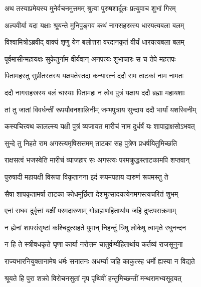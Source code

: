 
\twolineshloka
{अथ तस्याप्रमेयस्य मुनेर्वचनमुत्तमम्}
{श्रुत्वा पुरुषशार्दूलः प्रत्युवाच शुभां गिरम्} %

\twolineshloka
{अल्पवीर्या यदा यक्षाः श्रूयन्ते मुनिपुङ्गव}
{कथं नागसहस्रस्य धारयत्यबला बलम्} %

\twolineshloka
{विश्वामित्रोऽब्रवीद् वाक्यं शृणु येन बलोत्तरा}
{वरदानकृतं वीर्यं धारयत्यबला बलम्} %

\twolineshloka
{पूर्वमासीन्महायक्षः सुकेतुर्नाम वीर्यवान्}
{अनपत्यः शुभाचारः स च तेपे महत्तपः} %

\twolineshloka
{पितामहस्तु सुप्रीतस्तस्य यक्षपतेस्तदा}
{कन्यारत्नं ददौ राम ताटकां नाम नामतः} %

\twolineshloka
{ददौ नागसहस्रस्य बलं चास्याः पितामहः}
{न त्वेव पुत्रं यक्षाय ददौ ब्रह्मा महायशाः} %

\twolineshloka
{तां तु जातां विवर्धन्तीं रूपयौवनशालिनीम्}
{जम्भपुत्राय सुन्दाय ददौ भार्यां यशस्विनीम्} %

\twolineshloka
{कस्यचित्त्वथ कालल्स्य यक्षी पुत्रं व्यजायत}
{मारीचं नाम दुर्धर्षं यः शापाद्राक्षसोऽभवत्} %

\twolineshloka
{सुन्दे तु निहते राम अगस्त्यमृषिसत्तमम्}
{ताटका सह पुत्रेण प्रधर्षयितुमिच्छति} %

\twolineshloka
{राक्षसत्वं भजस्वेति मारीचं व्याजहार सः}
{अगस्त्यः परमक्रुद्धस्ताटकामपि शप्तवान्} %

\twolineshloka
{पुरुषादी महायक्षी विरूपा विकृतानना}
{इदं रूपमपहाय दारुणं रूपमस्तु ते} %

\twolineshloka
{सैषा शापकृतामर्षा ताटका क्रोधमूर्छिता}
{देशमुत्सादयत्येनमगस्त्यचरितं शुभम्} %

\twolineshloka
{एनां राघव दुर्वृत्तां यक्षीं परमदारुणाम्}
{गोब्राह्मणहितार्थाय जहि दुष्टपराक्रमाम्} %

\twolineshloka
{न ह्येनां शापसंसृष्टां कश्चिदुत्सहते पुमान्}
{निहन्तुं त्रिषु लोकेषु त्वामृते रघुनन्दन} %

\twolineshloka
{न हि ते स्त्रीवधकृते घृणा कार्या नरोत्तम}
{चातुर्वर्ण्यहितार्थाय कर्तव्यं राजसूनुना} %

\twolineshloka
{राज्यभारनियुक्तानामेष धर्मः सनातनः}
{अधर्म्यां जहि काकुत्स्ह धर्मो ह्यस्या न विद्यते} %

\twolineshloka
{श्रूयते हि पुरा शक्रो विरोचनसुतां नृप}
{पृथिवीं हन्तुमिच्छन्तीं मन्थरामभ्यसूदयत्} %

